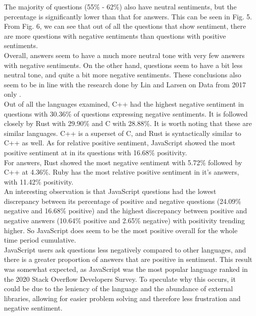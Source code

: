 \documentclass[conference]{IEEEtran}
\begin{document}
The majority of questions (55\% - 62\%) also have neutral sentiments, but the percentage is significantly lower than that for answers. This can be seen in Fig. 5. From Fig. 6, we can see that out of all the questions that show sentiment, there are more questions with negative sentiments than questions with positive sentiments. \\

Overall, answers seem to have a much more neutral tone with very few answers with negative sentiments. On the other hand, questions seem to have a bit less neutral tone, and quite a bit more negative sentiments. These conclusions also seem to be in line with the research done by Lin and Larsen on Data from 2017 only \cite{b11}.\\

Out of all the languages examined, C++ had the highest negative sentiment in questions with 30.36\% of questions expressing negative sentiments. It is followed closely by Rust with 29.90\% and C with 28.88\%. It is worth noting that these are similar languages. C++ is a superset of C, and Rust is syntactically similar to C++ as well\cite{b37}. As for relative positive sentiment, JavaScript showed the most positive sentiment at in its questions with 16.68\% positivity.\\

For answers, Rust showed the most negative sentiment with 5.72\% followed by C++ at 4.36\%. Ruby has the most relative positive sentiment in it's answers, with 11.42\% positivity.\\

An interesting observation is that JavaScript questions had the lowest discrepancy between its percentage of positive and negative questions (24.09\% negative and 16.68\% positive) and the highest discrepancy between positive and negative answers (10.64\% positive and 2.65\% negative) with positivity trending higher. So JavaScript does seem to be the most positive overall for the whole time period cumulative.\\

JavaScript users ask questions less negatively compared to other languages, and there is a greater proportion of answers that are positive in sentiment. This result was somewhat expected, as JavaScript was the most popular language ranked in the 2020 Stack Overflow Developers Survey\cite{b29}. To speculate why this occurs, it could be due to the leniency of the language and the abundance of external libraries, allowing for easier problem solving and therefore less frustration and negative sentiment. \\
\end{document}
